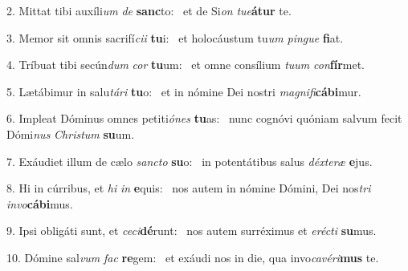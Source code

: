 2. Mittat tibi auxíli\textit{um} \textit{de} \textbf{sanc}to: \ast\  et de Si\textit{on} \textit{tu}\textit{e}\textbf{á}\textbf{tur} te.\

3. Memor sit omnis sacrifí\textit{ci}\textit{i} \textbf{tu}i: \ast\  et holocáustum tu\textit{um} \textit{pin}\textit{gue} \textbf{fi}at.\

4. Tríbuat tibi secún\textit{dum} \textit{cor} \textbf{tu}um: \ast\  et omne consílium \textit{tu}\textit{um} \textit{con}\textbf{fír}met.\

5. Lætábimur in salu\textit{tá}\textit{ri} \textbf{tu}o: \ast\  et in nómine Dei nostri \textit{ma}\textit{gni}\textit{fi}\textbf{cá}\textbf{bi}mur.\

6. Impleat Dóminus omnes petiti\textit{ó}\textit{nes} \textbf{tu}as: \ast\  nunc cognóvi quóniam salvum fecit Dómi\textit{nus} \textit{Chris}\textit{tum} \textbf{su}um.\

7. Exáudiet illum de cælo \textit{sanc}\textit{to} \textbf{su}o: \ast\  in potentátibus salus \textit{déx}\textit{te}\textit{ræ} \textbf{e}jus.\

8. Hi in cúrribus, et \textit{hi} \textit{in} \textbf{e}quis: \ast\  nos autem in nómine Dómini, Dei nos\textit{tri} \textit{in}\textit{vo}\textbf{cá}\textbf{bi}mus.\

9. Ipsi obligáti sunt, et \textit{ce}\textit{ci}\textbf{dé}runt: \ast\  nos autem surréximus et \textit{e}\textit{réc}\textit{ti} \textbf{su}mus.\

10. Dómine sal\textit{vum} \textit{fac} \textbf{re}gem: \ast\  et exáudi nos in die, qua invo\textit{ca}\textit{vé}\textit{ri}\textbf{mus} te.\


